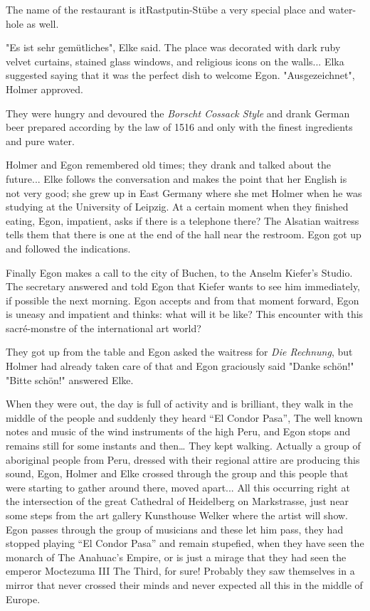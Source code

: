 \documentclass[smalldemyvopaper,11pt,twoside,onecolumn,openright,extrafontsizes]{memoir}
\begin{document}
The name of the restaurant is \text it{Rastputin-Stübe} a very special place and water-hole as well.

"Es ist sehr gemütliches", Elke said. The place was decorated with dark ruby velvet curtains, stained glass windows, and religious icons on the walls... Elka suggested 
 saying that it was the perfect dish to welcome Egon. "Ausgezeichnet", Holmer approved.  

They were hungry and devoured the \textit{Borscht Cossack Style} and drank German beer prepared according by the law of 1516 and only with the finest ingredients and pure water.

Holmer and Egon remembered old times; they drank and talked about the future... Elke follows the conversation and makes the point that her English is not very good; she grew up in East Germany where she met Holmer when he was studying at the University of Leipzig. At a certain moment when they finished eating, Egon, impatient, asks if there is a telephone there? The Alsatian waitress tells them that there is one at the end of the hall near the restroom. Egon got up and followed the indications.

Finally Egon makes a call to the city of Buchen, to the Anselm Kiefer’s Studio. The secretary answered and told Egon that Kiefer wants to see him immediately, if possible the next morning. Egon accepts and from that moment forward, Egon is uneasy and impatient and thinks: what will it be like? This encounter with this sacré-monstre of the international art world?

They got up from the table and Egon asked the waitress for \textit{Die Rechnung}, but Holmer had already taken care of that and Egon graciously said "Danke schön!"  "Bitte schön!" answered Elke.

When they were out, the day is full of activity and is brilliant, they walk in the middle of the people and suddenly they heard “El Condor Pasa”, The well known notes and music of the wind instruments of the high Peru, and Egon stops and remains still for some instants and then… They kept walking. Actually a group of aboriginal people from Peru, dressed with their regional attire are producing this sound, Egon, Holmer and Elke crossed through the group and this people that were starting to gather around there, moved apart... All this occurring right at the intersection of the great Cathedral of Heidelberg on Markstrasse, just near some steps from the art gallery Kunsthouse Welker where the artist will show. Egon passes through the group of musicians and these let him pass, they had stopped playing “El Condor Pasa” and remain stupefied, when they have seen the monarch of The Anahuac’s Empire, or is just a mirage that they had seen the emperor Moctezuma III The Third, for sure! Probably they saw themselves in a mirror that never crossed their minds and never expected all this in the middle of Europe.
\end{document}
